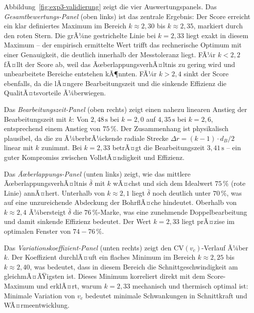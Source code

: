 ﻿\documentclass[12pt,a4paper]{article}
\begin{document}
Abbildung~\ref{fig:exp3-validierung} zeigt die vier Auswertungspanels. Das \textit{Gesamtbewertungs-Panel} (oben links) ist das zentrale Ergebnis: Der Score erreicht ein klar definiertes Maximum im Bereich $k \approx 2{,}30$ bis $k \approx 2{,}35$, markiert durch den roten Stern. Die grÃ¼ne gestrichelte Linie bei $k = 2{,}33$ liegt exakt in diesem Maximum -- der empirisch ermittelte Wert trifft das rechnerische Optimum mit einer Genauigkeit, die deutlich innerhalb der Messtoleranz liegt. FÃ¼r $k < 2{,}2$ fÃ¤llt der Score ab, weil das ÃœberlappungsverhÃ¤ltnis zu gering wird und unbearbeitete Bereiche entstehen kÃ¶nnten. FÃ¼r $k > 2{,}4$ sinkt der Score ebenfalls, da die lÃ¤ngere Bearbeitungszeit und die sinkende Effizienz die QualitÃ¤tsvorteile Ã¼berwiegen.

Das \textit{Bearbeitungszeit-Panel} (oben rechts) zeigt einen nahezu linearen Anstieg der Bearbeitungszeit mit $k$: Von $2{,}48\,\text{s}$ bei $k = 2{,}0$ auf $4{,}35\,\text{s}$ bei $k = 2{,}6$, entsprechend einem Anstieg von $75\,\%$. Der Zusammenhang ist physikalisch plausibel, da die zu Ã¼berbrÃ¼ckende radiale Strecke $\Delta r = (k - 1) \cdot d_B/2$ linear mit $k$ zunimmt. Bei $k = 2{,}33$ betrÃ¤gt die Bearbeitungszeit $3{,}41\,\text{s}$ -- ein guter Kompromiss zwischen VollstÃ¤ndigkeit und Effizienz.

Das \textit{Ãœberlappungs-Panel} (unten links) zeigt, wie das mittlere ÃœberlappungsverhÃ¤ltnis $\bar{\delta}$ mit $k$ wÃ¤chst und sich dem Idealwert $75\,\%$ (rote Linie) annÃ¤hert. Unterhalb von $k \approx 2{,}1$ liegt $\bar{\delta}$ noch deutlich unter $70\,\%$, was auf eine unzureichende Abdeckung der BohrflÃ¤che hindeutet. Oberhalb von $k \approx 2{,}4$ Ã¼bersteigt $\bar{\delta}$ die $76\,\%$-Marke, was eine zunehmende Doppelbearbeitung und damit sinkende Effizienz bedeutet. Der Wert $k = 2{,}33$ liegt prÃ¤zise im optimalen Fenster von $74{-}76\,\%$.

Das \textit{Variationskoeffizient-Panel} (unten rechts) zeigt den $\mathrm{CV}(v_c)$-Verlauf Ã¼ber $k$. Der Koeffizient durchlÃ¤uft ein flaches Minimum im Bereich $k \approx 2{,}25$ bis $k \approx 2{,}40$, was bedeutet, dass in diesem Bereich die Schnittgeschwindigkeit am gleichmÃ¤ÃŸigsten ist. Dieses Minimum korreliert direkt mit dem Score-Maximum und erklÃ¤rt, warum $k = 2{,}33$ mechanisch und thermisch optimal ist: Minimale Variation von $v_c$ bedeutet minimale Schwankungen in Schnittkraft und WÃ¤rmeentwicklung.
\end{document}
